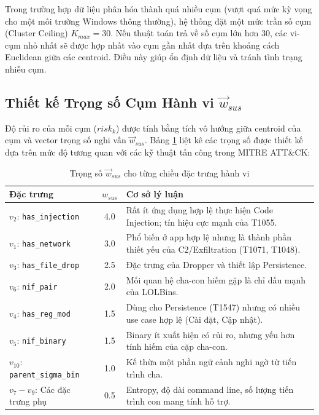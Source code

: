 \documentclass[../main.tex]{subfiles}
\begin{document}
Trong trường hợp dữ liệu phân hóa thành quá nhiều cụm (vượt quá mức kỳ vọng cho một môi trường Windows thông thường), hệ thống đặt một mức trần số cụm (Cluster Ceiling) $K_{max} = 30$. Nếu thuật toán trả về số cụm lớn hơn 30, các vi-cụm nhỏ nhất sẽ được hợp nhất vào cụm gần nhất dựa trên khoảng cách Euclidean giữa các centroid. Điều này giúp ổn định dữ liệu và tránh tình trạng nhiễu cụm.

\subsection{Thiết kế Trọng số Cụm Hành vi $\vec{w}_{sus}$}
\label{subsection:3.6.2}

Độ rủi ro của mỗi cụm ($risk_k$) được tính bằng tích vô hướng giữa centroid của cụm và vector trọng số nghi vấn $\vec{w}_{sus}$. Bảng \ref{tab:w_sus} liệt kê các trọng số được thiết kế dựa trên mức độ tương quan với các kỹ thuật tấn công trong MITRE ATT\&CK:

\begin{table}[h]
\centering
\begin{tabular}{|l|c|p{7cm}|}
\hline
\textbf{Đặc trưng} & \textbf{$w_{sus}$} & \textbf{Cơ sở lý luận} \\ \hline
$v_2$: \texttt{has\_injection} & 4.0 & Rất ít ứng dụng hợp lệ thực hiện Code Injection; tín hiệu cực mạnh của T1055. \\ \hline
$v_1$: \texttt{has\_network} & 3.0 & Phổ biến ở app hợp lệ nhưng là thành phần thiết yếu của C2/Exfiltration (T1071, T1048). \\ \hline
$v_3$: \texttt{has\_file\_drop} & 2.5 & Đặc trưng của Dropper và thiết lập Persistence. \\ \hline
$v_6$: \texttt{nif\_pair} & 2.0 & Mối quan hệ cha-con hiếm gặp là chỉ dấu mạnh của LOLBins. \\ \hline
$v_4$: \texttt{has\_reg\_mod} & 1.5 & Dùng cho Persistence (T1547) nhưng có nhiều use case hợp lệ (Cài đặt, Cập nhật). \\ \hline
$v_5$: \texttt{nif\_binary} & 1.5 & Binary ít xuất hiện có rủi ro, nhưng yếu hơn tính hiếm của cặp cha-con. \\ \hline
$v_{10}$: \texttt{parent\_sigma\_bin} & 1.0 & Kế thừa một phần ngữ cảnh nghi ngờ từ tiến trình cha. \\ \hline
$v_7 - v_9$: Các đặc trưng phụ & 0.5 & Entropy, độ dài command line, số lượng tiến trình con mang tính hỗ trợ. \\ \hline
\end{tabular}
\caption{Trọng số $\vec{w}_{sus}$ cho từng chiều đặc trưng hành vi}
\label{tab:w_sus}
\end{table}
\end{document}
